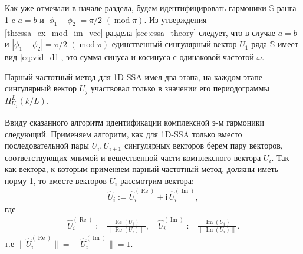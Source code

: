\documentclass[specialist,
               substylefile = spbu.rtx,
               subf,href,colorlinks=true, 12pt]{disser}
\def\RE{\mathop{\mathrm{Re}}}
\def\mod{\mathop{\mathrm{mod}}}
\def\IM{\mathop{\mathrm{Im}}}
\newcommand{\I}{\mathrm{i}}
\begin{document}
Как уже отмечали в начале раздела, будем идентифицировать гармоники $\mathbb{S}$ ранга 1 c $a=b$ и $|\phi_1 - \phi_2| = \pi/2 \,\,(\mod \pi)$.
 Из утверждения \ref{th:cssa_ex_mod_im_vec} раздела \ref{sec:cssa_theory} следует, что в случае $a=b$ и $|\phi_1 - \phi_2| = \pi/2 \,\,(\mod \pi)$ единственный сингулярный вектор $U_1$ ряда $\mathbb{S}$ имеет вид \eqref{eq:vid_d1}, это сумма синуса и косинуса с одинаковой частотой $\omega$.

Парный частотный метод для 1D-SSA имел два этапа, на каждом этапе сингулярный вектор $U_j$ участвовал только в значении его периодограммы $\Pi_{U_j}^L(k/L)$.

Ввиду сказанного алгоритм идентификации комплексной э-м гармоники следующий. Применяем алгоритм, как для 1D-SSA только вместо последовательной пары $U_i, U_{i+1}$ сингулярных векторов берем пару векторов, соответствующих мнимой и вещественной части  комплексного вектора $U_i$.
Так как вектора, к которым применяем парный частотный метод, должны иметь норму 1, то вместе векторов $U_i$ рассмотрим вектора: 
\begin{gather*}
\widehat{U}_{i} := \widehat{U}^{(\RE)}_{i} +  \I \,\widehat{U}^{(\IM)}_{i},
\end{gather*}
где
\begin{gather*} \label{eq:V_norm_mssa}
\widehat{U}^{(\RE)}_{i}:= \frac{\RE(U_i)}{\|\RE(U_i) \|}, \quad \widehat{U}^{(\IM)}_{i}:= \frac{\IM(U_i)}{\|\IM(U_i) \|}.
\end{gather*}
т.е $\| \widehat{U}^{(\RE)}_{i}\| = \| \widehat{U}^{(\IM)}_{i} \| = 1$. 
\end{document}
